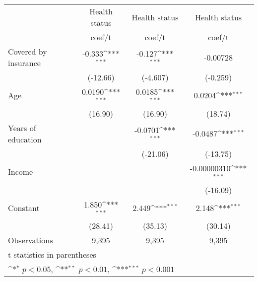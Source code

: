 {
\def\sym#1{\ifmmode^{#1}\else\(^{#1}\)\fi}
\begin{tabular}{l*{3}{c}}
\hline\hline
                &\multicolumn{1}{c}{Health status}&\multicolumn{1}{c}{Health status}&\multicolumn{1}{c}{Health status}\\
                &   coef/t         &   coef/t         &   coef/t         \\
\hline
Covered by insurance&   -0.333\sym{***}&   -0.127\sym{***}& -0.00728         \\
                & (-12.66)         & (-4.607)         & (-0.259)         \\
Age             &   0.0190\sym{***}&   0.0185\sym{***}&   0.0204\sym{***}\\
                &  (16.90)         &  (16.90)         &  (18.74)         \\
Years of education&                  &  -0.0701\sym{***}&  -0.0487\sym{***}\\
                &                  & (-21.06)         & (-13.75)         \\
Income          &                  &                  &-0.00000310\sym{***}\\
                &                  &                  & (-16.09)         \\
Constant        &    1.850\sym{***}&    2.449\sym{***}&    2.148\sym{***}\\
                &  (28.41)         &  (35.13)         &  (30.14)         \\
\hline
Observations    &    9,395         &    9,395         &    9,395         \\
\hline\hline
\multicolumn{4}{l}{\footnotesize t statistics in parentheses}\\
\multicolumn{4}{l}{\footnotesize \sym{*} \(p<0.05\), \sym{**} \(p<0.01\), \sym{***} \(p<0.001\)}\\
\end{tabular}
}
